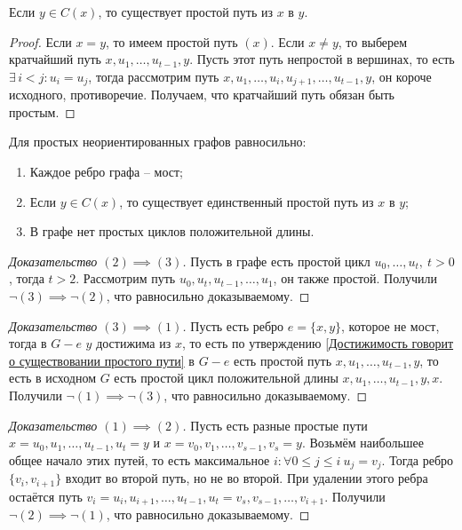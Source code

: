 \documentclass[12pt]{article}
\begin{document}
\begin{statement}\label{Достижимость говорит о существовании простого пути}
	Если $y\in C(x)$, то существует простой путь из $x$ в $y$.
	\begin{proof}
		Если $x=y$, то имеем простой путь $(x)$. Если $x\neq y$, то выберем
		кратчайший путь $x, u_1,\ldots, u_{t-1}, y$. Пусть этот путь
		непростой в вершинах, то есть $\exists\,i<j\colon u_i=u_j$, тогда
		рассмотрим путь
		$x, u_1, \ldots,u_i, u_{j+1}, \ldots, u_{t-1}, y$, он короче
		исходного, противоречие. Получаем, что кратчайший путь обязан быть простым.
	\end{proof}
\end{statement}
\begin{theorem}
	Для простых неориентированных графов равносильно:
	\begin{enumerate}
		\item Каждое ребро графа -- мост;
		\item Если $y\in C(x)$, то существует единственный простой путь из $x$ в $y$;
		\item В графе нет простых циклов положительной длины.
	\end{enumerate}
	\begin{proof}[Доказательство $(2)\implies(3)$]
		Пусть в графе есть простой цикл $u_0, \ldots,u_t,\ t>0$, тогда
		$t>2$. Рассмотрим путь $u_0, u_t, u_{t-1},\ldots,u_1$, он также
		простой. Получили $\lnot(3)\implies\lnot(2)$, что равносильно доказываемому.
	\end{proof}
	\begin{proof}[Доказательство $(3)\implies(1)$]
		Пусть есть ребро $e=\{x,y\}$, которое не мост, тогда в $G-e$ $y$
		достижима из $x$, то есть по утверждению \ref{Достижимость говорит
		о существовании простого пути} в $G-e$ есть простой путь
		$x,u_1,\ldots,u_{t-1},y$, то есть в исходном $G$ есть простой цикл
		положительной длины $x,u_1,\ldots,u_{t-1},y,x$. Получили
		$\lnot(1)\implies\lnot(3)$, что равносильно доказываемому.
	\end{proof}
	\begin{proof}[Доказательство $(1)\implies(2)$]
		Пусть есть разные простые пути $x=u_0, u_1,\ldots, u_{t-1}, u_t=y$ и $x=v_0,
		v_1,\ldots,v_{s-1},v_s=y$. Возьмём наибольшее общее начало этих
		путей, то есть максимальное $i\colon\forall0\leqslant j\leqslant
		i\  u_j=v_j$. Тогда ребро $\{v_i, v_{i+1}\}$ входит во второй путь,
		но не во второй. При удалении этого ребра остаётся путь $v_i=u_i,
		u_{i+1},\ldots,u_{t-1}, u_t=v_s, v_{s-1},\ldots, v_{i+1}$. Получили
		$\lnot(2)\implies\lnot(1)$, что равносильно доказываемому.
	\end{proof}
\end{theorem}
\end{document}
